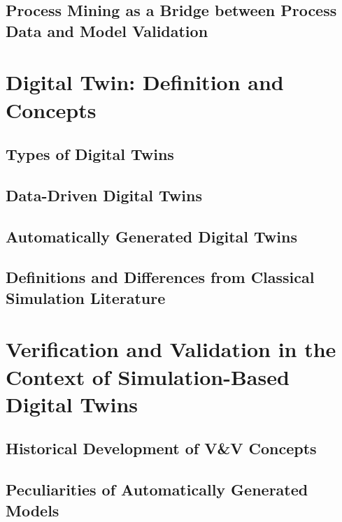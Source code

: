 \subsection{Process Mining as a Bridge between Process Data and Model Validation}

\section{Digital Twin: Definition and Concepts}
\subsection{Types of Digital Twins}

\subsection{Data-Driven Digital Twins}

\subsection{Automatically Generated Digital Twins}
\subsection{Definitions and Differences from Classical Simulation Literature}

\section{Verification and Validation in the Context of Simulation-Based Digital Twins}


\subsection{Historical Development of V\&V Concepts}

\subsection{Peculiarities of Automatically Generated Models}

